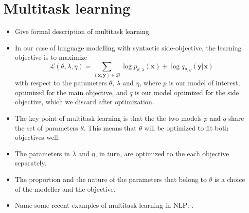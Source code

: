 \section{Multitask learning}
\begin{itemize}
  \item Give formal description of multitask learning.
  \item In our case of language modelling with syntactic side-objective, the learning objective is to maximize
  \begin{equation*}
    \mathcal{L}(\theta, \lambda, \eta) = \sum_{ (\mathbf{x}, \mathbf{y}) \in \mathcal{D} }\log p_{\theta, \lambda}(\mathbf{x}) + \log q_{\theta,\eta}(\mathbf{y} | \mathbf{x})
  \end{equation*}
  with respect to the parameters $\theta$, $\lambda$ and $\eta$, where $p$ is our model of interest, optimized for the main objective, and $q$ is our model optimized for the side objective, which we discard after optimization.
  \item The key point of multitask learning is that the the two models $p$ and $q$ share the set of parameters $\theta$. This means that $\theta$ will be optimized to fit both objectives well.
  \item The parameters in $\lambda$ and $\eta$, in turn, are optimized to the each objective separately.
  \item The proportion and the nature of the parameters that belong to $\theta$ is a choice of the modeller and the objective.
  \item Name some recent examples of multitask learning in NLP: \cite{Zhang+2016:multitask,Goldberg+2016:multitask,Swayamdipta+2018:scaffold}.
\end{itemize}
